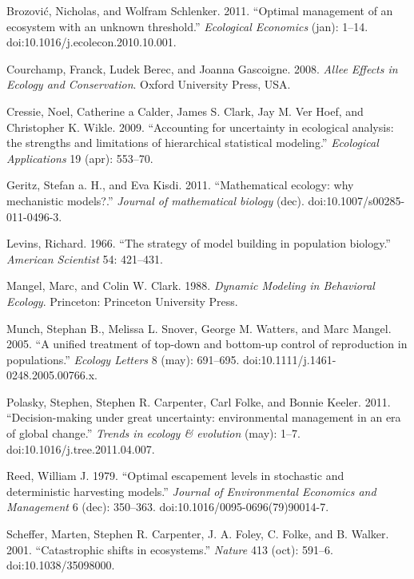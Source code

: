 \documentclass[author-year, review]{elsarticle} %
\begin{document}
Brozović, Nicholas, and Wolfram Schlenker. 2011. ``Optimal management of
an ecosystem with an unknown threshold.'' \emph{Ecological Economics}
(jan): 1--14. doi:10.1016/j.ecolecon.2010.10.001.

Courchamp, Franck, Ludek Berec, and Joanna Gascoigne. 2008. \emph{Allee
Effects in Ecology and Conservation}. Oxford University Press, USA.

Cressie, Noel, Catherine a Calder, James S. Clark, Jay M. Ver Hoef, and
Christopher K. Wikle. 2009. ``Accounting for uncertainty in ecological
analysis: the strengths and limitations of hierarchical statistical
modeling.'' \emph{Ecological Applications} 19 (apr): 553--70.

Geritz, Stefan a. H., and Eva Kisdi. 2011. ``Mathematical ecology: why
mechanistic models?.'' \emph{Journal of mathematical biology} (dec).
doi:10.1007/s00285-011-0496-3.

Levins, Richard. 1966. ``The strategy of model building in population
biology.'' \emph{American Scientist} 54: 421--431.

Mangel, Marc, and Colin W. Clark. 1988. \emph{Dynamic Modeling in
Behavioral Ecology}. Princeton: Princeton University Press.

Munch, Stephan B., Melissa L. Snover, George M. Watters, and Marc
Mangel. 2005. ``A unified treatment of top-down and bottom-up control of
reproduction in populations.'' \emph{Ecology Letters} 8 (may): 691--695.
doi:10.1111/j.1461-0248.2005.00766.x.

Polasky, Stephen, Stephen R. Carpenter, Carl Folke, and Bonnie Keeler.
2011. ``Decision-making under great uncertainty: environmental
management in an era of global change.'' \emph{Trends in ecology \&
evolution} (may): 1--7. doi:10.1016/j.tree.2011.04.007.

Reed, William J. 1979. ``Optimal escapement levels in stochastic and
deterministic harvesting models.'' \emph{Journal of Environmental
Economics and Management} 6 (dec): 350--363.
doi:10.1016/0095-0696(79)90014-7.

Scheffer, Marten, Stephen R. Carpenter, J. A. Foley, C. Folke, and B.
Walker. 2001. ``Catastrophic shifts in ecosystems.'' \emph{Nature} 413
(oct): 591--6. doi:10.1038/35098000.



\end{document}
